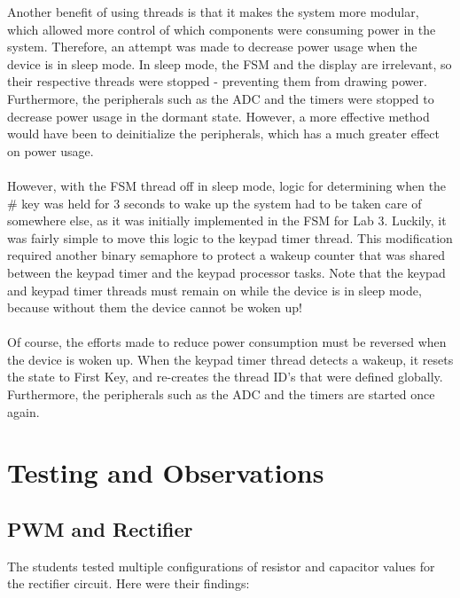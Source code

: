 \documentclass[12pt]{report}
\begin{document}
Another benefit of using threads is that it makes the system more modular, which allowed more
control of which components were consuming power in the system. Therefore, an attempt was made to
decrease power usage when the device is in sleep mode. In sleep mode, the FSM and the display are
irrelevant, so their respective threads were stopped - preventing them from drawing power.
Furthermore, the peripherals such as the ADC and the timers were stopped to decrease power usage in
the dormant state. However, a more effective method would have been to deinitialize the peripherals,
which has a much greater effect on power usage.\\\\
However, with the FSM thread off in sleep mode, logic for determining when the \# key was held for 3
seconds to wake up the system had to be taken care of somewhere else, as it was initially
implemented in the FSM for Lab 3. Luckily, it was fairly simple to move this logic to the keypad
timer thread. This modification required another binary semaphore to protect a wakeup counter that
was shared between the keypad timer and the keypad processor tasks. Note that the keypad and keypad
timer threads must remain on while the device is in
sleep mode, because without them the device cannot be woken up!\\\\
Of course, the efforts made to reduce power consumption must be reversed when the device is woken
up. When the keypad timer thread detects a wakeup, it resets the state to First Key, and re-creates
the thread ID's that were defined globally. Furthermore, the peripherals such as the ADC and the
timers are started once again.


\section{Testing and Observations}

\subsection{PWM and Rectifier}\label{testpwm}

The students tested multiple configurations of resistor and capacitor values for the rectifier circuit. Here were their findings:\\
\end{document}
